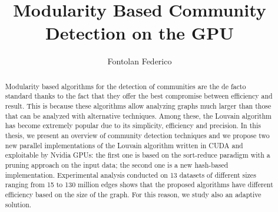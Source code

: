 \documentclass[12pt,a4paper,titlepage]{article}
\title{Modularity Based Community Detection on the GPU}
\author{Fontolan Federico}
\begin{document}
	
	
	\begin{abstract}
		Modularity based algorithms for the detection of communities are the de facto standard thanks to the fact that they offer the best compromise between efficiency and result. 
		This is because these algorithms allow analyzing graphs much larger than those that can be analyzed with alternative techniques. Among these, the Louvain algorithm has become extremely popular due to its simplicity, efficiency and precision.
		In this thesis, we present an overview of community detection techniques and we propose two new parallel implementations of the Louvain algorithm written in CUDA and exploitable by Nvidia GPUs: the first one is based on the sort-reduce paradigm with a pruning approach on the input data; the second one is a new hash-based implementation. Experimental analysis conducted on 13 datasets of different sizes ranging from 15 to 130 million edges shows that the proposed algorithms have different efficiency based on the size of the graph. For this reason, we study also an adaptive solution.
	\end{abstract}

	\tableofcontents
	\newpage
	
	\newpage
	
	\newpage
	
	\newpage
	
	\newpage
	
	\newpage
	
	\newpage
	
	\newpage
	\printbibliography
\end{document}
